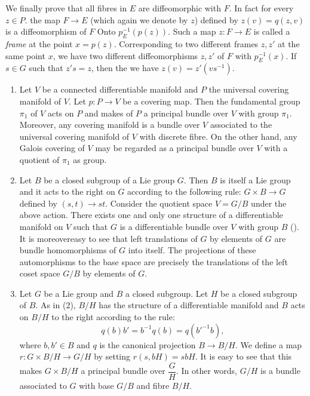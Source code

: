 We finally prove that all fibres in $E$ are diffeomorphic with $F$. In
fact for every $z \in P$. the map $F \to E$ (which again we denote by
$z$) defined by $z (v) = q ( z , v )$ is a diffeomorphism of $F$ Onto
$p^{-1}_E (p (z))$. Such a map $z : F \to E$ is called a
\textit{frame} at the point $x = p(z)$. Corresponding to two different
frames $z, z ' $ at the same point $x$, we have two different
diffeomorphisms $z, z' $ of $F$ with $p^{-1}_E (x)$. If $s \in G$ such
that $z ' s = z $, then the we have $z (v) = z' ( vs^{-1})$. 

\begin{examples*}
  \begin{enumerate}[(1)]
  \item Let $V$ be a connected differentiable manifold and $P$ the
    universal covering manifold of $V$. Let $p : P \to V$ be a
    covering map. Then the fundamental group $\pi_1 $ of $V$ acts on
    $P$ and makes of  $P$ a principal bundle over $V$ with group
    $\pi_1$. Moreover, any covering manifold is a bundle over $V$
    associated to the universal covering manifold of $V$ with
    discrete fibre. On the other hand, any Galois covering of $V$ may
    be regarded as a principal bundle over $V$ with a quotient of $\pi
    _1 $ as group. 
  \item Let $B$ be a closed subgroup of a Lie group $G$. Then $B$ is
    itself a Lie group and it acts to the right on $G$ according to
    the following rule: $G \times  B \to G$ defined by $( s, t) \to
    st$. Consider the quotient space $V = {G}/{B}$ under the
    above action. There exists one and only one structure of a
    differentiable manifold on $V$ such that $G$ is a differentiable
    bundle over $V$ with group $B$ (\cite{29}). It is
    moreover\pageoriginale easy to 
    see that left translations of $G$ by elements of $G$ are bundle
    homomorphisms of $G$ into itself. The projections of these
    automorphisms to the base space are precisely the translations of
    the left coset space ${G}/{B}$ by elements of $G$.  
  \item Let $G$ be a Lie group and $B$ a closed subgroup. Let $H$ be a
    closed subgroup of $B$. As in (2), ${B}/{H}$ has the structure
    of a differentiable manifold and $B$ acts on ${B}/{H}$ to the
    right according to the rule:   
    $$
    q (b) b' = b^{-1}  q (b) = q(b'^ {-1} b), 
    $$
    where $b, b' \in B$ and $q$ is the canonical projection $B \to
    {B}/{H}$. We define a map $r : G\times {B}/{H} \to
    {G}/{H} $ by setting $ r ( s, bH ) = sb H$. It is easy to see
    that this makes $G \times {B}/{H}$ a principal bundle over
    $\dfrac{G}{H}$. In other words, ${G}/{H}$ is a bundle
    associated to $G$ with base ${G}/{B}$ and fibre ${B}/{H}$.  
  \end{enumerate} 
\end{examples*}

